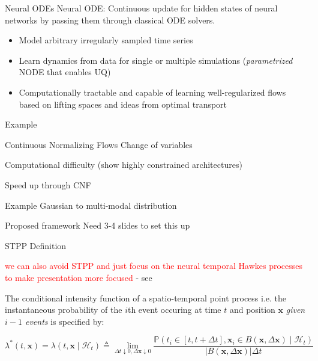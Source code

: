 \documentclass{beamer}
\begin{document}
\begin{frame}{Neural ODEs}
    Neural ODE: Continuous update for hidden states of neural networks by passing them through classical ODE solvers.

    \begin{itemize}
        \item Model arbitrary irregularly sampled time series

        \item Learn dynamics from data for single or multiple simulations (\emph{parametrized} NODE that enables UQ)

        \item Computationally tractable and capable of learning well-regularized flows based on lifting spaces and ideas from optimal transport
    \end{itemize}
\end{frame}

\begin{frame}{Example}
    
\end{frame}

\begin{frame}{Continuous Normalizing Flows}
    Change of variables

    Computational difficulty (show highly constrained architectures)

    Speed up through CNF
\end{frame}

\begin{frame}{Example}
    Gaussian to multi-modal distribution
\end{frame}

\begin{frame}{Proposed framework}
    Need 3-4 slides to set this up
\end{frame}

\begin{frame}{STPP Definition}

\textcolor{red}{we can also avoid STPP and just focus on the neural temporal Hawkes processes to make presentation more focused } - see \cite{jia_neural_2020}

The conditional intensity function of a spatio-temporal point process i.e. the instantaneous probability of the $i$th event occuring at time $t$ and position $\boldsymbol{x}$ \emph{given $i-1$ events} is specified by:

\begin{equation*}
\lambda^{\ast}(t, \boldsymbol{x}) = \lambda(t,\boldsymbol{x}\mid\mathcal{H}_t)\triangleq\lim_{\Delta t\downarrow0,\Delta\boldsymbol{x}\downarrow0}\frac{\mathbb{P}\left(t_i\in[t,t+\Delta t],\boldsymbol{x}_i\in B(\boldsymbol{x},\Delta\boldsymbol{x})\mid\mathcal{H}_t\right)}{|B(\boldsymbol{x},\Delta\boldsymbol{x})|\Delta t}
\end{equation*}

\end{frame}
\end{document}
